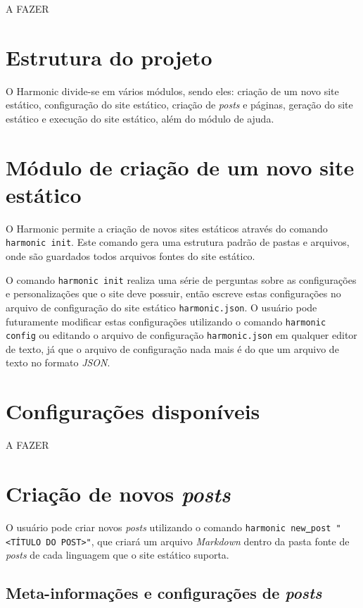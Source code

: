 \documentclass[ppginf, pep]{esinucpel}
\newcommand{\code}[1]{\texttt{#1}}
\begin{document}
A FAZER

\section{Estrutura do projeto}

O Harmonic divide-se em vários módulos, sendo eles: criação de um novo site estático, configuração do site estático, criação de \textit{posts} e páginas, geração do site estático e execução do site estático, além do módulo de ajuda.

\section{Módulo de criação de um novo site estático}

O Harmonic permite a criação de novos sites estáticos através do comando \code{harmonic init}. Este comando gera uma estrutura padrão de pastas e arquivos, onde são guardados todos arquivos fontes do site estático.

O comando \code{harmonic init} realiza uma série de perguntas sobre as configurações e personalizações que o site deve possuir, então escreve estas configurações no arquivo de configuração do site estático \code{harmonic.json}. O usuário pode futuramente modificar estas configurações utilizando o comando \code{harmonic config} ou editando o arquivo de configuração \code{harmonic.json} em qualquer editor de texto, já que o arquivo de configuração nada mais é do que um arquivo de texto no formato \emph{JSON}.


\section{Configurações disponíveis}

A FAZER

\section{Criação de novos \textit{posts}}

O usuário pode criar novos \textit{posts} utilizando o comando \code{harmonic new\underline{ }post "\textless TÍTULO DO POST\textgreater"}, que criará um arquivo \emph{Markdown} dentro da pasta fonte de \textit{posts} de cada linguagem que o site estático suporta.

\subsection{Meta-informações e configurações de \textit{posts}}
\end{document}
